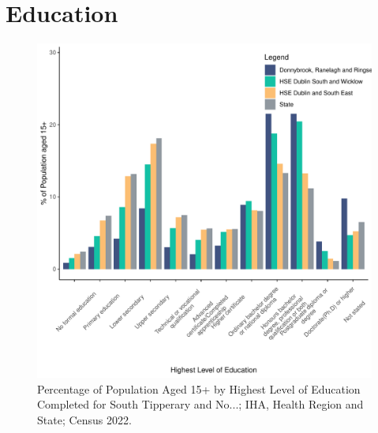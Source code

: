 \documentclass{article}
\begin{document}
\section{Education}\label{sect:Edu}
\begin{figure}[H]
	\centering
	\includegraphics[width = 120mm]{../figures/EduED.pdf}
	\caption{Percentage of Population Aged 15+ by Highest Level of Education Completed for South Tipperary and No...; IHA, Health Region and State; Census 2022.}
	\label{fig:vbnv}
	\end{figure}
\end{document}

